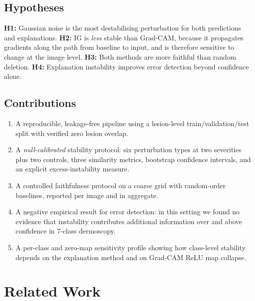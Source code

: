 \documentclass[conference]{IEEEtran}
\begin{document}
\subsection{Hypotheses}
\textbf{H1:} Gaussian noise is the most destabilising perturbation for both
predictions and explanations. \textbf{H2:} IG is \emph{less} stable than
Grad-CAM, because it propagates gradients along the path from
baseline to input, and is therefore sensitive to change at the image level.
\textbf{H3:} Both methods are more faithful than random deletion.
\textbf{H4:} Explanation instability improves error detection beyond
confidence alone.

\subsection{Contributions}
\begin{enumerate}
\item A reproducible, leakage-free pipeline using a lesion-level
train/validation/test split with verified zero lesion overlap.
\item A \emph{null-calibrated} stability protocol: six perturbation types at
two severities plus two controls, three similarity metrics, bootstrap
confidence intervals, and an explicit excess-instability measure.
\item A controlled faithfulness protocol on a coarse grid with
random-order baselines, reported per image and in aggregate.
\item A negative empirical result for error detection: in this setting we
found no evidence that instability contributes additional information over
and above confidence in 7-class dermoscopy.
\item A per-class and zero-map sensitivity profile showing how class-level
stability depends on the explanation method and on Grad-CAM ReLU map collapse.
\end{enumerate}

\section{Related Work}
\end{document}
